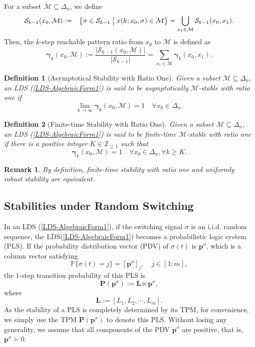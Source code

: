 \documentclass[11pt,onecolumn]{article}
\newtheorem{remark}{Remark}
\newtheorem{definition}{Definition}
\begin{document}
  For a subset $\mathcal M\subseteq\Delta_n$, we define
\begin{eqnarray*}
   \mathcal S_{k-1}(x_0,\mathcal M)&:=&\left\{\sigma\in\mathcal S_{k-1}\bigm| x(k;x_0,\sigma)\in \mathcal M\right\}=\bigcup_{x_1\in\mathcal M}\mathcal S_{k-1}(x_0,x_1).
\end{eqnarray*}
Then, the $k$-step reachable pattern ratio from $x_0$ to $\mathcal M$ is defined as
\[\boldsymbol\gamma_k(x_0,\mathcal M):=\frac{|\mathcal S_{k-1}(x_0,\mathcal M)|}{|\mathcal S_{k-1}|}=\sum_{x_1\in\mathcal M} \boldsymbol\gamma_k(x_0,x_1).\]

\begin{definition}[Asymptotical Stability with Ratio One]\label{DefinitionASRO}
   Given a subset $\mathcal M\subseteq\Delta_n$, an LDS (\ref{LDS-AlgebraicForm1}) is said to be asymptotically $\mathcal M$-stable with ratio one if
   \[\lim_{k\rightarrow\infty}\boldsymbol\gamma_k(x_0,\mathcal M)=1\quad\forall x_0\in\Delta_n.\]
\end{definition}

\begin{definition}[Finite-time Stability with Ratio One]\label{DefinitionFTSRO}
   Given a subset $\mathcal M\subseteq\Delta_n$, an LDS (\ref{LDS-AlgebraicForm1}) is said to be finite-time $\mathcal M$-stable with ratio one if there is a positive integer $K\in\mathbb Z_{\geq1}$ such that
   \[\boldsymbol\gamma_k(x_0,\mathcal M)=1\quad\forall x_0\in\Delta_n,\forall k\geq K.\]
\end{definition}

 \begin{remark}
By definition, finite-time stability with ratio one and uniformly robust stability are equivalent.
 \end{remark}


\subsection{Stabilities under Random Switching}

 In an LDS (\ref{LDS-AlgebraicForm1}),
if the switching signal $\sigma$ is an i.i.d. random sequence, the LDS(\ref{LDS-AlgebraicForm1}) becomes a  probabilistic logic system (PLS). If the probability distribution vector (PDV) of $\sigma(t)$ is $\boldsymbol p^\sigma$, which is a column vector satisfying
\[\mathbb P\{\sigma(t)=j\}=[\boldsymbol p^\sigma]_j,\quad j\in[1:m],\] the $1$-step transition probability of this PLS is
\begin{equation}
  \mathbf P(\boldsymbol p^\sigma):=\mathbf L\ltimes\boldsymbol p^\sigma,
\end{equation}
where
\[\mathbf L:=[L_1,L_2,\cdots, L_m].\]
As the stability of a PLS is completely determined by its TPM, for convenience, we simply use the TPM $\mathbf P(\boldsymbol p^\sigma)$ to denote this PLS. Without losing any generality, we assume that all components of the PDV $\boldsymbol p^\sigma$ are positive, that is, $\boldsymbol p^\sigma\succ0$.
\end{document}
